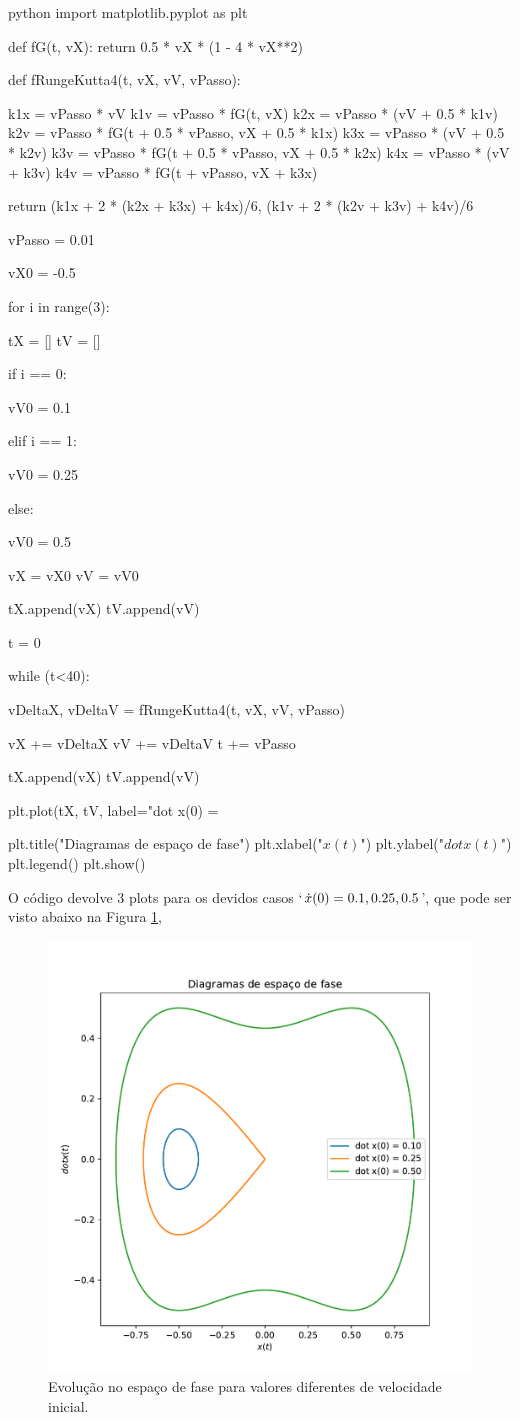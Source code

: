 \documentclass[twoside]{amsart}
\numberwithin{equation}{section}
\begin{document}
\begin{mintedbox}{python}
import matplotlib.pyplot as plt

def fG(t, vX):
    return 0.5 * vX * (1 - 4 * vX**2)

def fRungeKutta4(t, vX, vV, vPasso):

    k1x = vPasso * vV
    k1v = vPasso * fG(t, vX)
    k2x = vPasso * (vV + 0.5 * k1v)
    k2v = vPasso * fG(t + 0.5 * vPasso, vX + 0.5 * k1x)
    k3x = vPasso * (vV + 0.5 * k2v)
    k3v = vPasso * fG(t + 0.5 * vPasso, vX + 0.5 * k2x)
    k4x = vPasso * (vV + k3v)
    k4v = vPasso * fG(t + vPasso, vX + k3x)

    return (k1x + 2 * (k2x + k3x) + k4x)/6, (k1v + 2 * (k2v + k3v) + k4v)/6

vPasso = 0.01

vX0 = -0.5

for i in range(3):

    tX = []
    tV = []

    if i == 0:

        vV0 = 0.1

    elif i == 1:

        vV0 = 0.25

    else:

        vV0 = 0.5

    vX = vX0
    vV = vV0

    tX.append(vX)
    tV.append(vV)
    
    t = 0

    while (t<40):

        vDeltaX, vDeltaV = fRungeKutta4(t, vX, vV, vPasso)

        vX += vDeltaX
        vV += vDeltaV
        t += vPasso

        tX.append(vX)
        tV.append(vV)

    plt.plot(tX, tV, label="dot x(0) = %

plt.title("Diagramas de espaço de fase")
plt.xlabel("$x(t)$")
plt.ylabel("$dot x(t)$")
plt.legend()
plt.show()
\end{mintedbox}

O código devolve 3 plots para os devidos casos `$\dot x\qty(0)=0.1,0.25,0.5$', que pode ser visto abaixo na Figura 
\ref{fig1},

\begin{figure}[h]
    \includegraphics[width=0.5\linewidth]{II-1a.pdf}
    \caption{Evolução no espaço de fase para valores diferentes de velocidade inicial.}
    \label{fig1}
\end{figure}
\end{document}

